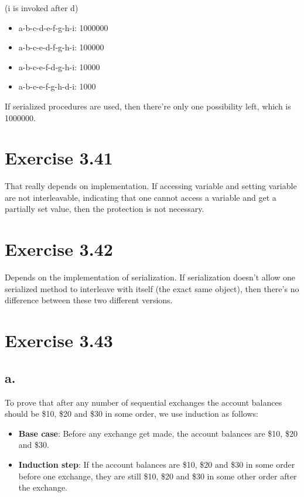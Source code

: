\documentclass[../main.tex]{subfiles}
\begin{document}
(i is invoked after d)

\begin{itemize}
\item a-b-c-d-e-f-g-h-i: 1000000
\item a-b-c-e-d-f-g-h-i: 100000
\item a-b-c-e-f-d-g-h-i: 10000
\item a-b-c-e-f-g-h-d-i: 1000
\end{itemize}

If serialized procedures are used, then there're only one possibility left, which is 1000000.

\section{Exercise 3.41}

That really depends on implementation. If accessing variable and setting variable are not interleavable, indicating that one cannot access a variable and get a partially set value, then the protection is not necessary.

\section{Exercise 3.42}

Depends on the implementation of serialization. If serialization doesn't allow one serialized method to interleave with itself (the exact same object), then there's no difference between these two different versions.

\section{Exercise 3.43}

\subsection{a.}

To prove that after any number of sequential exchanges the account balances should be \$10, \$20 and \$30 in some order, we use induction as follows:

\begin{itemize}
\item \textbf{Base case}: Before any exchange get made, the account balances are \$10, \$20 and \$30.
\item \textbf{Induction step}: If the account balances are \$10, \$20 and \$30 in some order before one exchange, they are still \$10, \$20 and \$30 in some other order after the exchange.
\end{itemize}
\end{document}
